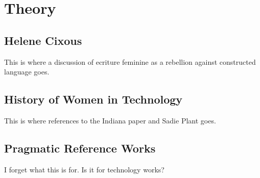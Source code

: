 
\section{Theory}

\subsection{Helene Cixous}
This is where a discussion of ecriture feminine as a rebellion against constructed language goes.

\subsection{History of Women in Technology}
This is where references to the Indiana paper and Sadie Plant goes.

\subsection{Pragmatic Reference Works}
I forget what this is for. Is it for technology works?

